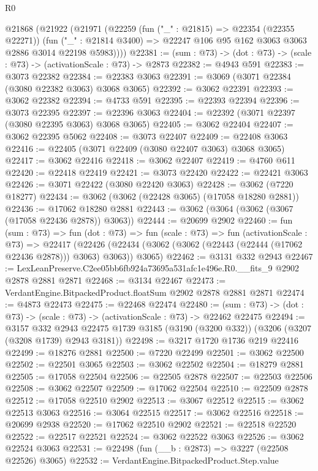 \begin{lexlean}{R0}
\begin{coremodule}
  @21868
    (@21922
      (@21971
        (@22259
          (fun ("_" : @21815) => @22354 (@22355 @22271))
          (fun ("_" : @21814 @3400) => @22247 @106 @95 @162 @3063 @3063 @2886 @3014 @22198 @5983))))
@22381 := (sum : @73) -> (dot : @73) -> (scale : @73) -> (activationScale : @73) -> @2873
@22382 := @4943 @591
@22383 := @3073 @22382
@22384 := @22383 @3063
@22391 := @3069 (@3071 @22384 (@3080 @22382 @3063) @3068 @3065)
@22392 := @3062 @22391
@22393 := @3062 @22382
@22394 := @4733 @591
@22395 := @22393 @22394
@22396 := @3073 @22395
@22397 := @22396 @3063
@22404 := @22392 (@3071 @22397 (@3080 @22395 @3063) @3068 @3065)
@22405 := @3062 @22404
@22407 := @3062 @22395 @5062
@22408 := @3073 @22407
@22409 := @22408 @3063
@22416 := @22405 (@3071 @22409 (@3080 @22407 @3063) @3068 @3065)
@22417 := @3062 @22416
@22418 := @3062 @22407
@22419 := @4760 @611
@22420 := @22418 @22419
@22421 := @3073 @22420
@22422 := @22421 @3063
@22426 := @3071 @22422 (@3080 @22420 @3063)
@22428 := @3062 (@7220 @18277)
@22434 := @3062 (@3062 (@22428 @3065) (@17058 @18280 @2881))
@22436 := @17062 @18280 @2881
@22443 := @3062 (@3064 (@3062 (@3067 (@17058 @22436 @2878)) @3063))
@22444 := @20699 @2902
@22460 := fun (sum : @73) =>
  fun (dot : @73) =>
  fun (scale : @73) =>
  fun (activationScale : @73) =>
  @22417 (@22426 (@22434 (@3062 (@3062 (@22443 (@22444 (@17062 @22436 @2878))) @3063) @3063)) @3065)
@22462 := @3131 @332 @2943
@22467 := LexLeanPreserve.C2ee05bb6fb924a73695a531afc1e496e.R0.__fits_9 @2902 @2878 @2881 @2871
@22468 := @3134 @22467
@22473 := VerdantEngine.BitpackedProduct.floatSum @2902 @2878 @2881 @2871
@22474 := @4873 @22473
@22475 := @22468 @22474
@22480 := (sum : @73) -> (dot : @73) -> (scale : @73) -> (activationScale : @73) -> @22462 @22475
@22494 := @3157
    @332
    @2943
    @22475
    @1739
    @3185
    (@3190 (@3200 @332))
    (@3206 (@3207 (@3208 @1739) @2943 @3181))
@22498 := @3217 @1720 @1736 @219 @22416
@22499 := @18276 @2881
@22500 := @7220 @22499
@22501 := @3062 @22500
@22502 := @22501 @3065
@22503 := @3062 @22502
@22504 := @18279 @2881
@22505 := @17058 @22504
@22506 := @22505 @2878
@22507 := @22503 @22506
@22508 := @3062 @22507
@22509 := @17062 @22504
@22510 := @22509 @2878
@22512 := @17058 @22510 @2902
@22513 := @3067 @22512
@22515 := @3062 @22513 @3063
@22516 := @3064 @22515
@22517 := @3062 @22516
@22518 := @20699 @2938
@22520 := @17062 @22510 @2902
@22521 := @22518 @22520
@22522 := @22517 @22521
@22524 := @3062 @22522 @3063
@22526 := @3062 @22524 @3063
@22531 := @22498 (fun (__b : @2873) => @3227 (@22508 @22526) @3065)
@22532 := VerdantEngine.BitpackedProduct.Step.value

\end{coremodule}
\end{lexlean}
